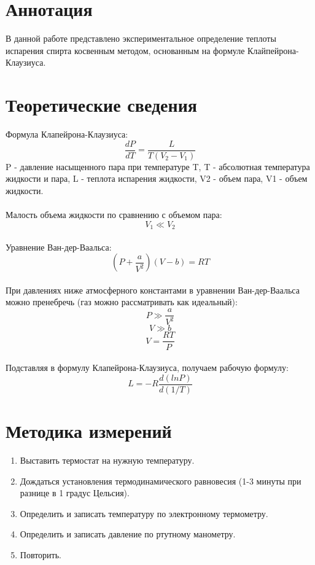 \documentclass[1 pt]{article}
\begin{document}
\section{Аннотация}
\large В данной работе представлено экспериментальное определение теплоты испарения спирта косвенным методом, основанным на формуле Клайпейрона-Клаузиуса.
\section{Теоретические сведения}
Формула Клапейрона-Клаузиуса:
\begin{equation}
    \frac{dP}{dT} = \frac{L}{T(V_2-V_1)}
\end{equation}
P - давление насыщенного пара при температуре T, 
T - абсолютная температура жидкости и пара, 
L - теплота испарения жидкости, 
V2 - объем пара, 
V1 - объем жидкости. \\
\\
Малость объема жидкости по сравнению с объемом пара:
\begin{equation*}
    V_1 \ll V_2
\end{equation*}
\\
Уравнение Ван-дер-Ваальса:
\begin{equation}
    (P+\frac{a}{V^2})(V-b) = RT
\end{equation}
\\
При давлениях ниже атмосферного константами в уравнении Ван-дер-Ваальса можно пренебречь (газ можно рассматривать как идеальный):
\begin{equation*}
    P \gg \frac{a}{V^2}
\end{equation*}
\begin{equation*}
    V \gg b
\end{equation*}
\begin{equation}
    V = \frac{RT}{P}
\end{equation}
\\
Подставляя в формулу Клапейрона-Клаузиуса, получаем рабочую формулу:
\begin{equation}
    L = -R \frac{d(ln P)}{d(1/T)}
\end{equation}
\newpage
\section{Методика измерений}
\begin{enumerate} 
\item Выставить термостат на нужную температуру.
\item Дождаться установления термодинамического равновесия (1-3 минуты при разнице в 1 градус Цельсия).
\item Определить и записать температуру по электронному термометру.
\item Определить и записать давление по ртутному манометру.
\item Повторить.
\end{enumerate}
\end{document}
